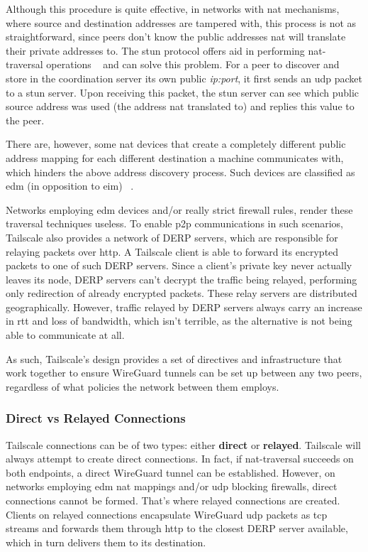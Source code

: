 \documentclass[11pt,twoside,a4paper]{report}
\begin{document}
Although this procedure is quite effective, in networks with \ac{nat} mechanisms, where source and destination addresses are tampered with, this process is not as straightforward, since peers don't know the public addresses \ac{nat} will translate their private addresses to. The \ac{stun} protocol offers aid in performing \ac{nat}-traversal operations ~\cite{rfc8489} and can solve this problem. For a peer to discover and store in the coordination server its own public \emph{ip:port}, it first sends an \ac{udp} packet to a \ac{stun} server. Upon receiving this packet, the \ac{stun} server can see which public source address was used (the address \ac{nat} translated to) and replies this value to the peer.

There are, however, some \ac{nat} devices that create a completely different public address mapping for each different destination a machine communicates with, which hinders the above address discovery process. Such devices are classified as \ac{edm} (in opposition to \ac{eim}) ~\cite{rfc4787}.

Networks employing \ac{edm} devices and/or really strict firewall rules, render these traversal techniques useless. To enable \ac{p2p} communications in such scenarios, Tailscale also provides a network of \ac{DERP} servers, which are responsible for relaying packets over \ac{http}. A Tailscale client is able to forward its encrypted packets to one of such \ac{DERP} servers. Since a client's private key never actually leaves its node, \ac{DERP} servers can't decrypt the traffic being relayed, performing only redirection of already encrypted packets. These relay servers are distributed geographically. However, traffic relayed by \ac{DERP} servers always carry an increase in \ac{rtt} and loss of bandwidth, which isn't terrible, as the alternative is not being able to communicate at all.

As such, Tailscale's design provides a set of directives and infrastructure that work together to ensure WireGuard tunnels can be set up between any two peers, regardless of what policies the network between them employs.

\subsubsection{Direct vs Relayed Connections}

Tailscale connections can be of two types: either \textbf{direct} or \textbf{relayed}. Tailscale will always attempt to create direct connections. In fact, if \ac{nat}-traversal succeeds on both endpoints, a direct WireGuard tunnel can be established. However, on networks employing \ac{edm} \ac{nat} mappings and/or \ac{udp} blocking firewalls, direct connections cannot be formed. That's where relayed connections are created. Clients on relayed connections encapsulate WireGuard \ac{udp} packets as \ac{tcp} streams and forwards them through \ac{http} to the closest \ac{DERP} server available, which in turn delivers them to its destination.
\end{document}
